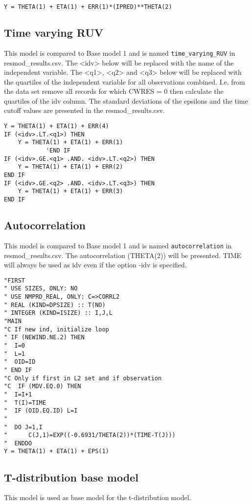 \begin{verbatim}
Y = THETA(1) + ETA(1) + ERR(1)*(IPRED)**THETA(2)
\end{verbatim}

\subsection{Time varying RUV}
This model is compared to Base model 1 and is named \verb|time_varying_RUV| in resmod\_results.csv. The <idv> below will be replaced with the name of the independent variable. The <q1>, <q2> and <q3> below will be replaced with the quartiles of the independent variable for all observations combined. I.e. from the data set remove all records for which CWRES = 0 then calculate the quartiles of the idv column. The standard deviations of the epsilons and the time cutoff values are presented in the resmod\_results.csv.
\begin{verbatim}
Y = THETA(1) + ETA(1) + ERR(4)
IF (<idv>.LT.<q1>) THEN
    Y = THETA(1) + ETA(1) + ERR(1)
            'END IF
IF (<idv>.GE.<q1> .AND. <idv>.LT.<q2>) THEN
    Y = THETA(1) + ETA(1) + ERR(2)
END IF
IF (<idv>.GE.<q2> .AND. <idv>.LT.<q3>) THEN
    Y = THETA(1) + ETA(1) + ERR(3)
END IF
\end{verbatim}

\subsection{Autocorrelation}
This model is compared to Base model 1 and is named \verb|autocorrelation| in resmod\_results.csv. The autocorrelation (THETA(2)) will be presented. TIME will always be used as idv even if the option -idv is specified.
\begin{verbatim}
"FIRST
" USE SIZES, ONLY: NO
" USE NMPRD_REAL, ONLY: C=>CORRL2
" REAL (KIND=DPSIZE) :: T(NO)
" INTEGER (KIND=ISIZE) :: I,J,L
"MAIN
"C If new ind, initialize loop
" IF (NEWIND.NE.2) THEN
"  I=0
"  L=1
"  OID=ID
" END IF
"C Only if first in L2 set and if observation
"C  IF (MDV.EQ.0) THEN
"  I=I+1
"  T(I)=TIME
"  IF (OID.EQ.ID) L=I
"
"  DO J=1,I
"      C(J,1)=EXP((-0.6931/THETA(2))*(TIME-T(J)))
"  ENDDO
Y = THETA(1) + ETA(1) + EPS(1)
\end{verbatim}
\newpage

\subsection{T-distribution base model}
This model is used as base model for the t-distribution model.

